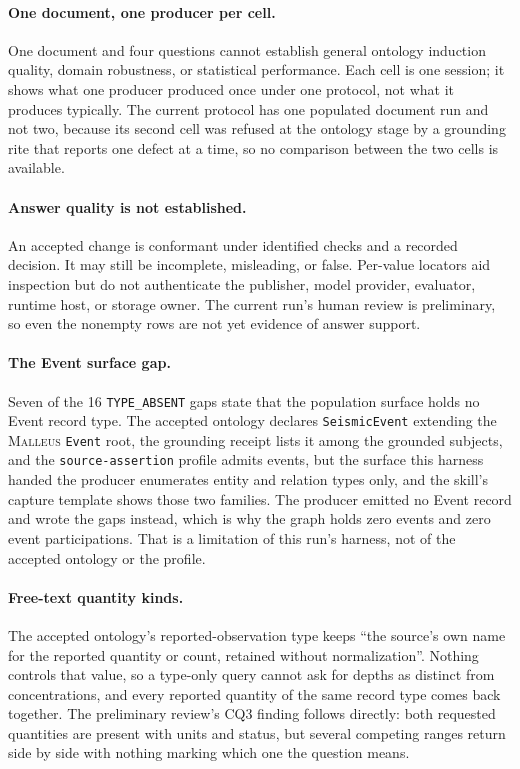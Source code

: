 \documentclass[10pt]{article}
\newcommand{\malleus}{\textsc{Malleus}}
\newcommand{\code}[1]{\texttt{#1}}
\begin{document}
\paragraph{One document, one producer per cell.} One document and four questions cannot establish general ontology induction quality, domain robustness, or statistical performance. Each cell is one session; it shows what one producer produced once under one protocol, not what it produces typically. The current protocol has one populated document run and not two, because its second cell was refused at the ontology stage by a grounding rite that reports one defect at a time, so no comparison between the two cells is available.

\paragraph{Answer quality is not established.} An accepted change is conformant under identified checks and a recorded decision. It may still be incomplete, misleading, or false. Per-value locators aid inspection but do not authenticate the publisher, model provider, evaluator, runtime host, or storage owner. The current run's human review is preliminary, so even the nonempty rows are not yet evidence of answer support.

\paragraph{The Event surface gap.} Seven of the 16 \code{TYPE\_ABSENT} gaps state that the population surface holds no Event record type. The accepted ontology declares \code{SeismicEvent} extending the \malleus{} \code{Event} root, the grounding receipt lists it among the grounded subjects, and the \code{source-assertion} profile admits events, but the surface this harness handed the producer enumerates entity and relation types only, and the skill's capture template shows those two families. The producer emitted no Event record and wrote the gaps instead, which is why the graph holds zero events and zero event participations. That is a limitation of this run's harness, not of the accepted ontology or the profile.

\paragraph{Free-text quantity kinds.} The accepted ontology's reported-observation type keeps ``the source's own name for the reported quantity or count, retained without normalization''. Nothing controls that value, so a type-only query cannot ask for depths as distinct from concentrations, and every reported quantity of the same record type comes back together. The preliminary review's CQ3 finding follows directly: both requested quantities are present with units and status, but several competing ranges return side by side with nothing marking which one the question means.
\end{document}
